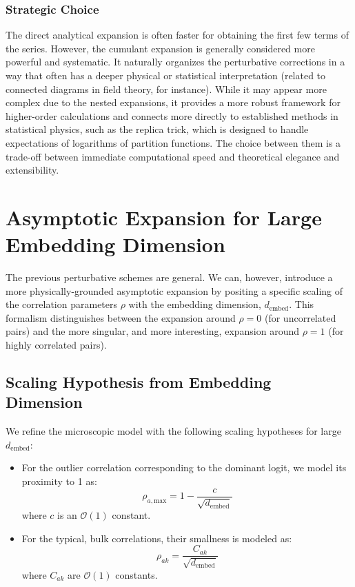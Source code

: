 \documentclass[12pt]{article}
\begin{document}
\subsubsection*{Strategic Choice}
The direct analytical expansion is often faster for obtaining the first few terms of the series. However, the cumulant expansion is generally considered more powerful and systematic. It naturally organizes the perturbative corrections in a way that often has a deeper physical or statistical interpretation (related to connected diagrams in field theory, for instance). While it may appear more complex due to the nested expansions, it provides a more robust framework for higher-order calculations and connects more directly to established methods in statistical physics, such as the replica trick, which is designed to handle expectations of logarithms of partition functions. The choice between them is a trade-off between immediate computational speed and theoretical elegance and extensibility.

\section{Asymptotic Expansion for Large Embedding Dimension}

The previous perturbative schemes are general. We can, however, introduce a more physically-grounded asymptotic expansion by positing a specific scaling of the correlation parameters $\rho$ with the embedding dimension, $d_{\text{embed}}$. This formalism distinguishes between the expansion around $\rho=0$ (for uncorrelated pairs) and the more singular, and more interesting, expansion around $\rho=1$ (for highly correlated pairs).

\subsection{Scaling Hypothesis from Embedding Dimension}
We refine the microscopic model with the following scaling hypotheses for large $d_{\text{embed}}$:
\begin{itemize}
    \item For the outlier correlation corresponding to the dominant logit, we model its proximity to 1 as: 
    \[\rho_{a, \text{max}} = 1 - \frac{c}{\sqrt{d_{\text{embed}}}}\]
    where $c$ is an $\mathcal{O}(1)$ constant.
    \item For the typical, bulk correlations, their smallness is modeled as:
    \[\rho_{ak} = \frac{C_{ak}}{\sqrt{d_{\text{embed}}}}\]
    where $C_{ak}$ are $\mathcal{O}(1)$ constants.
\end{itemize}
\end{document}
